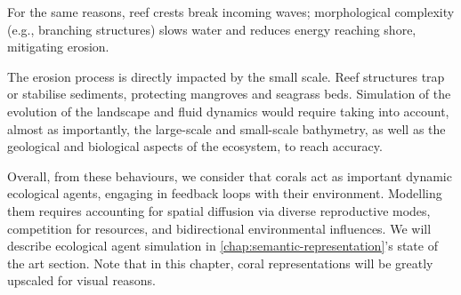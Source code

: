 
For the same reasons, reef crests break incoming waves; morphological complexity (e.g., branching structures) slows water and reduces energy reaching shore, mitigating erosion.

The erosion process is directly impacted by the small scale. Reef structures trap or stabilise sediments, protecting mangroves and seagrass beds. Simulation of the evolution of the landscape and fluid dynamics would require taking into account, almost as importantly, the large-scale and small-scale bathymetry, as well as the geological and biological aspects of the ecosystem, to reach accuracy.


Overall, from these behaviours, we consider that corals act as important dynamic ecological agents, engaging in feedback loops with their environment. Modelling them requires accounting for spatial diffusion via diverse reproductive modes, competition for resources, and bidirectional environmental influences. We will describe ecological agent simulation in \cref{chap:semantic-representation}'s state of the art section. Note that in this chapter, coral representations will be greatly upscaled for visual reasons.


